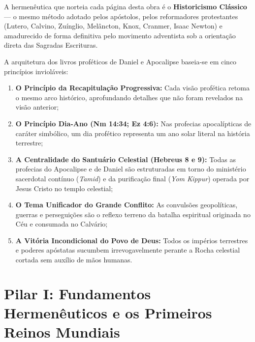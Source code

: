\documentclass[11pt,a4paper,openany]{book}
\begin{document}
A hermenêutica que norteia cada página desta obra é o \textbf{Historicismo Clássico} --- o mesmo método adotado pelos apóstolos, pelos reformadores protestantes (Lutero, Calvino, Zuínglio, Melâncton, Knox, Cranmer, Isaac Newton) e amadurecido de forma definitiva pelo movimento adventista sob a orientação direta das Sagradas Escrituras.

A arquitetura dos livros proféticos de Daniel e Apocalipse baseia-se em cinco princípios invioláveis:
\begin{enumerate}
    \item \textbf{O Princípio da Recapitulação Progressiva:} Cada visão profética retoma o mesmo arco histórico, aprofundando detalhes que não foram revelados na visão anterior;
    \item \textbf{O Princípio Dia-Ano (Nm 14:34; Ez 4:6):} Nas profecias apocalípticas de caráter simbólico, um dia profético representa um ano solar literal na história terrestre;
    \item \textbf{A Centralidade do Santuário Celestial (Hebreus 8 e 9):} Todas as profecias do Apocalipse e de Daniel são estruturadas em torno do ministério sacerdotal contínuo (\textit{Tamid}) e da purificação final (\textit{Yom Kippur}) operada por Jesus Cristo no templo celestial;
    \item \textbf{O Tema Unificador do Grande Conflito:} As convulsões geopolíticas, guerras e perseguições são o reflexo terreno da batalha espiritual originada no Céu e consumada no Calvário;
    \item \textbf{A Vitória Incondicional do Povo de Deus:} Todos os impérios terrestres e poderes apóstatas sucumbem irrevogavelmente perante a Rocha celestial cortada sem auxílio de mãos humanas.
\end{enumerate}

\tableofcontents

\mainmatter

\chapter{Pilar I: Fundamentos Hermenêuticos e os Primeiros Reinos Mundiais}
\end{document}

